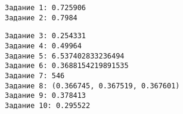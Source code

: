 \documentclass[11pt]{article}
\makeatletter
\newcommand{\boxspacing}{\kern\kvtcb@left@rule\kern\kvtcb@boxsep}
\newcommand{\prompt}[4]{
        {\ttfamily\llap{{\color{#2}[#3]:\hspace{3pt}#4}}\vspace{-\baselineskip}}
    }
\makeatother
\begin{document}
    \begin{Verbatim}[commandchars=\\\{\}]
Задание 1: 0.725906
Задание 2: 0.7984
    \end{Verbatim}

    \begin{Verbatim}[commandchars=\\\{\}]
Задание 3: 0.254331
Задание 4: 0.49964
Задание 5: 6.537402833236494
Задание 6: 0.3688154219891535
Задание 7: 546
Задание 8: (0.366745, 0.367519, 0.367601)
Задание 9: 0.378413
Задание 10: 0.295522
    \end{Verbatim}

    \begin{tcolorbox}[breakable, size=fbox, boxrule=1pt, pad at break*=1mm,colback=cellbackground, colframe=cellborder]
\prompt{In}{incolor}{ }{\boxspacing}
\begin{Verbatim}[commandchars=\\\{\}]

\end{Verbatim}
\end{tcolorbox}


    
    
    
\end{document}
